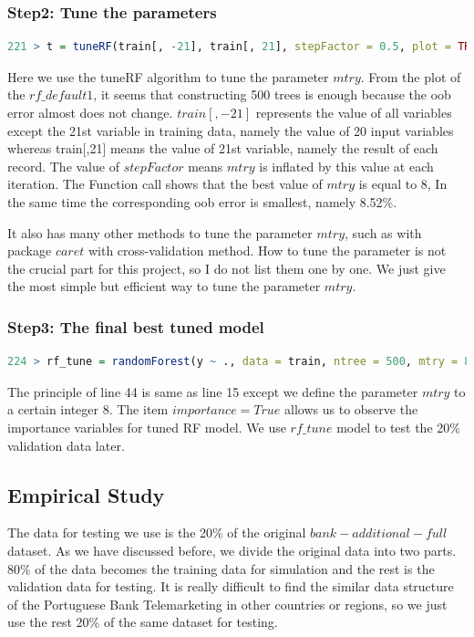 \documentclass[12pt, a4paper, bibliography=totoc, english]{scrartcl}
\begin{document}
\subsubsection{Step2: Tune the parameters}

\begin{lstlisting}[language = R]
221 > t = tuneRF(train[, -21], train[, 21], stepFactor = 0.5, plot = TRUE, ntreeTry=500, trace = TRUE, improve = 0.05)
\end{lstlisting}
Here we use the tuneRF algorithm to tune the parameter $mtry$. From the plot of the $rf\_default1$, it seems that constructing 500 trees is enough because the oob error almost does not change. $train[,-21]$ represents the value of all variables except the 21st variable in training data, namely the value of 20 input variables whereas train[,21] means the value of  21st variable, namely the result of each record. The value of $stepFactor$ means $mtry$ is inflated by this value at each iteration.
The Function call shows that the best value of $mtry$ is equal to 8, In the same time the corresponding oob error is smallest, namely 8.52\%.  

It also has many other methods to tune the parameter $mtry$, such as with package $caret$ with cross-validation method. How to tune the parameter is not the crucial part for this project, so I do not list them one by one. We just give the most simple but efficient way to tune the parameter $mtry$. 

\subsubsection{Step3: The final best tuned model}

\begin{lstlisting}[language = R]
224 > rf_tune = randomForest(y ~ ., data = train, ntree = 500, mtry = 8, importance = TRUE, proximity = TRUE)
\end{lstlisting}
The principle of line 44 is same as line 15 except we define the parameter $mtry$ to a certain integer 8. The item $importance=True$ allows us to observe the importance variables for tuned RF model. We use $rf\_tune$ model to test the 20\% validation data later. \\

\subsection{Empirical Study}

The data for testing we use is the 20\% of the original $bank-additional-full$ dataset. As we have discussed before, we divide the original data into two parts. 80\% of the data becomes the training data for simulation and the rest is the validation data for testing. It is really difficult to find the similar data structure of the Portuguese Bank Telemarketing in other countries or regions, so we just use the rest 20\% of the same dataset for testing. 
\end{document}
